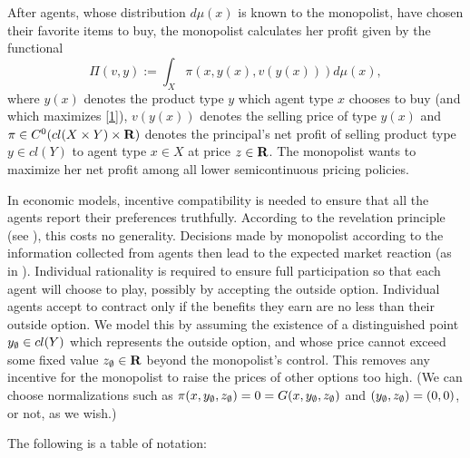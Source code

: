 After agents, whose distribution $d \mu(x)$ is known to the monopolist, have chosen their favorite items to buy, the monopolist calculates her profit given by the functional 
\begin{equation}\label{profit}
\Pi(v, y):=\int_{X} \pi(x,y(x),v(y(x))) d\mu(x),
\end{equation}
where $y(x)$ denotes the product type $y$ which agent type $x$ chooses to buy (and which maximizes \eqref{1}), $v(y(x))$ denotes the selling price of type $y(x)$ and $\pi \in C^0(cl(X\times Y)\times {\mathbf R})$ denotes the principal's net profit of selling product type $y \in cl(Y)$ to agent type $x \in X$ at price $z \in {\mathbf R}$. 
The monopolist wants to maximize her net profit among all lower semicontinuous pricing policies. \medskip







In economic models, 
incentive compatibility is  needed to ensure that all the agents report their preferences truthfully. 
According to the revelation principle (see \cite{Myerson79}), this costs no generality.
Decisions made by monopolist according to the information collected from agents then lead 
to the expected market reaction (as in \cite{Carlier01, RochetChone98}).  
Individual rationality
is required to ensure full participation so that each agent will choose to play,  possibly by accepting the outside option. Individual agents accept to contract only if the benefits they earn are no less than their outside option. We model this by assuming the existence of a distinguished point $y_{\emptyset} \in cl(Y)$ which represents the outside option, and whose price cannot exceed some fixed value $z_{\emptyset} \in {\mathbf R}$ beyond the monopolist's control. This removes any incentive for the monopolist to raise the prices of other options too high. (We can choose normalizations such as $\pi(x,y_{\emptyset},z_{\emptyset})=0=G(x,y_{\emptyset},z_{\emptyset})$ and $(y_{\emptyset},z_{\emptyset})=(0,0)$, or not, as we wish.)\medskip

The following is a table of notation:\medskip

